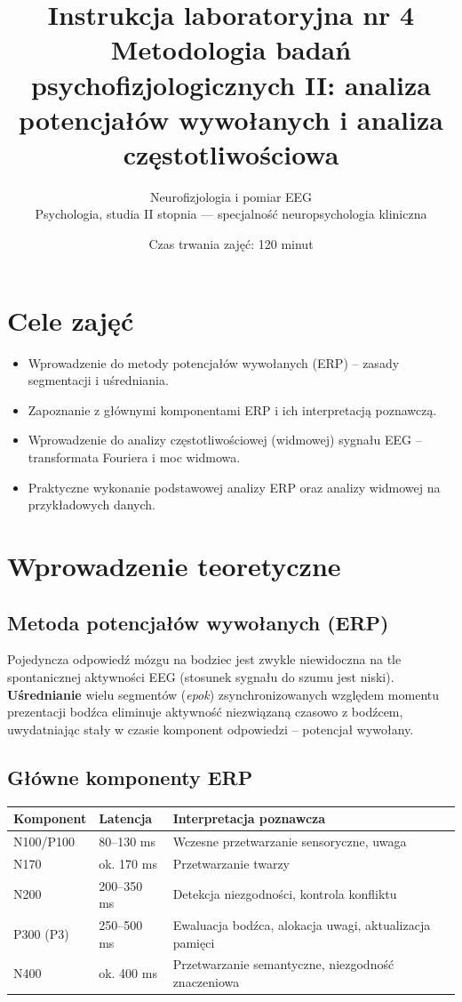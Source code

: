 \documentclass[11pt,a4paper]{article}
\title{\vspace{-1.5cm}\textbf{\color{navy}Instrukcja laboratoryjna nr 4}\\[4pt]
\Large Metodologia badań psychofizjologicznych II: analiza potencjałów wywołanych i analiza częstotliwościowa}
\author{Neurofizjologia i pomiar EEG\\ Psychologia, studia II stopnia --- specjalność neuropsychologia kliniczna}
\date{Czas trwania zajęć: 120 minut}
\begin{document}
\maketitle
\thispagestyle{fancy}

\section{Cele zajęć}
\begin{itemize}[nosep]
  \item Wprowadzenie do metody potencjałów wywołanych (ERP) -- zasady segmentacji i uśredniania.
  \item Zapoznanie z głównymi komponentami ERP i ich interpretacją poznawczą.
  \item Wprowadzenie do analizy częstotliwościowej (widmowej) sygnału EEG -- transformata Fouriera i moc widmowa.
  \item Praktyczne wykonanie podstawowej analizy ERP oraz analizy widmowej na przykładowych danych.
\end{itemize}

\section{Wprowadzenie teoretyczne}

\subsection{Metoda potencjałów wywołanych (ERP)}
Pojedyncza odpowiedź mózgu na bodziec jest zwykle niewidoczna na tle spontanicznej aktywności EEG (stosunek sygnału do szumu jest niski). \textbf{Uśrednianie} wielu segmentów (\emph{epok}) zsynchronizowanych względem momentu prezentacji bodźca eliminuje aktywność niezwiązaną czasowo z bodźcem, uwydatniając stały w czasie komponent odpowiedzi -- potencjał wywołany.

\subsection{Główne komponenty ERP}
\begin{center}
\begin{tabular}{@{}lll@{}}
\toprule
\textbf{Komponent} & \textbf{Latencja} & \textbf{Interpretacja poznawcza}\\
\midrule
N100/P100 & 80--130 ms & Wczesne przetwarzanie sensoryczne, uwaga\\
N170 & ok. 170 ms & Przetwarzanie twarzy\\
N200 & 200--350 ms & Detekcja niezgodności, kontrola konfliktu\\
P300 (P3) & 250--500 ms & Ewaluacja bodźca, alokacja uwagi, aktualizacja pamięci\\
N400 & ok. 400 ms & Przetwarzanie semantyczne, niezgodność znaczeniowa\\
\bottomrule
\end{tabular}
\end{center}
\end{document}

